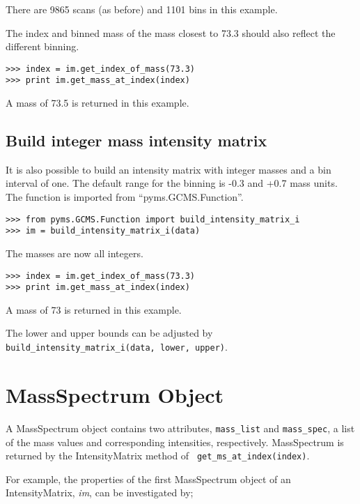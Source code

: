 There are 9865 scans (as before) and 1101 bins in this example.

The index and binned mass of the mass closest to 73.3 should also reflect the
different binning.
\begin{verbatim}
>>> index = im.get_index_of_mass(73.3)
>>> print im.get_mass_at_index(index)
\end{verbatim}

A mass of 73.5 is returned in this example.

\subsection{Build integer mass intensity matrix}


It is also possible to build an intensity matrix with integer masses and a bin
interval of one. The default range for the binning is -0.3 and +0.7 mass
units. The function is imported from ``pyms.GCMS.Function''.

\begin{verbatim}
>>> from pyms.GCMS.Function import build_intensity_matrix_i
>>> im = build_intensity_matrix_i(data)
\end{verbatim}

The masses are now all integers.

\begin{verbatim}
>>> index = im.get_index_of_mass(73.3)
>>> print im.get_mass_at_index(index)
\end{verbatim}

A mass of 73 is returned in this example.

The lower and upper bounds can be adjusted by {\tt
build\_intensity\_matrix\_i(data, lower, upper)}.

\section{MassSpectrum Object}


\noindent
A MassSpectrum object contains two attributes, {\tt mass\_list} and
{\tt mass\_spec}, a list of the mass values and corresponding intensities,
respectively. MassSpectrum is returned by the IntensityMatrix method of {\tt
get\_ms\_at\_index(index)}.

For example, the properties of the first MassSpectrum object of an
IntensityMatrix, {\em im}, can be investigated by;


